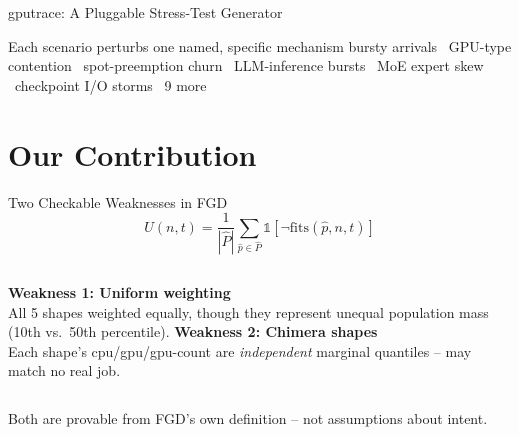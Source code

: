 \documentclass[aspectratio=169]{beamer}
\begin{document}
\begin{frame}{gputrace: A Pluggable Stress-Test Generator}
\centering
{}

\vspace{0.5cm}
\begin{exampleblock}{Each scenario perturbs one named, specific mechanism}
bursty arrivals \textbullet\ GPU-type contention \textbullet\ spot-preemption
churn \textbullet\ LLM-inference bursts \textbullet\ MoE expert skew
\textbullet\ checkpoint I/O storms \textbullet\ 9 more
\end{exampleblock}
\end{frame}

\section{Our Contribution}
\begin{frame}{Two Checkable Weaknesses in FGD}
\[
  U(n,t)=\frac{1}{|\hat P|}\sum_{\hat p\in\hat P}\mathbb{1}[\neg\mathrm{fits}(\hat p,n,t)]
\]
\begin{columns}
\textbf{Weakness 1: Uniform weighting}\\
\small All 5 shapes weighted equally, though they represent unequal
population mass (10th vs.\ 50th percentile).
\textbf{Weakness 2: Chimera shapes}\\
\small Each shape's cpu/gpu/gpu-count are \emph{independent} marginal
quantiles -- may match no real job.
\end{columns}
\vspace{0.4cm}
\begin{alertblock}{Both are provable from FGD's own definition -- not assumptions about intent.}
\end{alertblock}
\end{frame}
\end{document}
